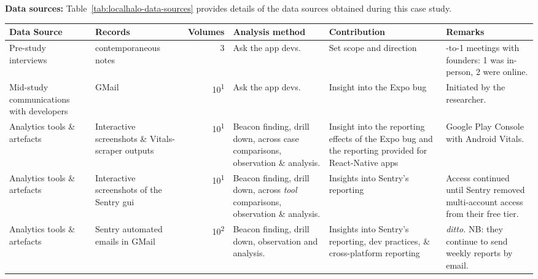 \textbf{Data sources:} Table~\ref{tab:localhalo-data-sources} provides details of the data sources obtained during this case study.

\begin{table*}
    \centering
    \footnotesize
    \tabcolsep=0.12cm
    \begin{tabular}{p{2.4cm}p{2.4cm}r>{\raggedright}p{2.4cm}>{\raggedright}p{3cm}>{\raggedright\arraybackslash}p{2.5cm}} %
        Data Source & Records & Volumes & Analysis method & Contribution & Remarks \\
        \toprule
         Pre-study interviews & contemporaneous notes\footnotemark & 3 & Ask the app devs. & Set scope and direction & 1-to-1 meetings with founders: 1 was in-person, 2 were online. \\
         Mid-study communications with developers & GMail & 10\textsuperscript{1} & Ask the app devs. & Insight into the Expo bug & Initiated by the researcher. \\
         Analytics tools \& artefacts &Interactive screenshots \& Vitals-scraper outputs &10\textsuperscript{1} & Beacon finding, drill down, across case comparisons, observation \& analysis. & Insight into the reporting effects of the Expo bug and the reporting provided for React-Native apps & Google Play Console with Android Vitals. \\
         Analytics tools \& artefacts & Interactive screenshots of the Sentry \acrshort{gui} & 10\textsuperscript{1} & Beacon finding, drill down, across \textit{tool} comparisons\footnotemark, observation \& analysis. & Insights into Sentry's reporting & Access continued until Sentry removed multi-account access from their free tier. \\
         Analytics tools \& artefacts & Sentry automated emails in GMail & 10\textsuperscript{2} & Beacon finding, drill down, observation and analysis. & Insights into Sentry's reporting, dev practices, \& cross-platform reporting & \textit{ditto.} NB: they continue to send weekly reports by email. \\
         \bottomrule
    \end{tabular}
    \caption{LocalHalo: data sources}
    \label{tab:localhalo-data-sources}
\end{table*}



